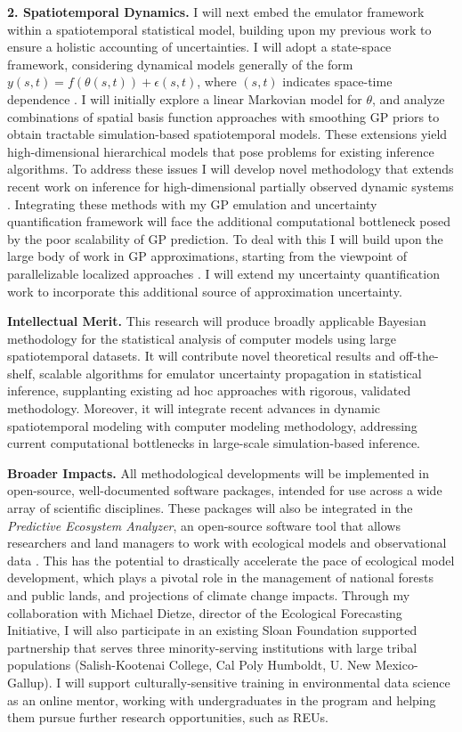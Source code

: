 \documentclass[11pt]{article}
\begin{document}
 \textbf{2. Spatiotemporal Dynamics.} I will next embed the emulator framework within a spatiotemporal statistical model, building upon my previous work to ensure a holistic accounting of uncertainties. I will adopt a state-space framework, considering dynamical models generally of the form $y(s, t) = f(\theta(s, t)) + \epsilon(s, t)$, where $(s, t)$ indicates space-time dependence \cite{Wikle, Hefley}. I will initially explore a linear Markovian model for $\theta$, and analyze combinations of spatial basis function approaches with smoothing GP priors to obtain tractable simulation-based spatiotemporal models. 
These extensions yield high-dimensional hierarchical models that pose problems for existing inference algorithms. To address these issues I will develop novel methodology that extends recent work on inference for high-dimensional partially observed dynamic systems \cite{Park}. Integrating these methods with my GP emulation and uncertainty quantification framework will face the additional computational bottleneck posed by the poor scalability of GP prediction. To deal with this I will build upon the large body of work in GP approximations, starting from the viewpoint of parallelizable localized approaches \cite{Gramacy}. I will extend my uncertainty quantification work to incorporate this additional source of approximation uncertainty. 

\noindent
\textbf{Intellectual Merit.} This research will produce broadly applicable Bayesian methodology for the statistical analysis of computer models using large spatiotemporal datasets. It will contribute novel theoretical results and off-the-shelf, scalable algorithms for emulator uncertainty propagation in statistical inference, supplanting existing ad hoc approaches with rigorous, validated methodology. Moreover, it will integrate recent advances in dynamic spatiotemporal modeling with computer modeling methodology, addressing current computational bottlenecks in large-scale simulation-based inference.

\noindent
\textbf{Broader Impacts.} All methodological developments will be implemented in open-source, well-documented software packages, intended for use across a wide array of scientific disciplines. These packages will also be integrated in the \textit{Predictive Ecosystem Analyzer}, an open-source software tool that allows researchers and land managers to work with ecological models and observational data \cite{Fer}. This has the potential to drastically accelerate the pace of ecological model development, which plays a pivotal role in the management of national forests and public lands, and projections of climate change impacts. Through my collaboration with Michael Dietze, director of the Ecological Forecasting Initiative, I will also participate in an existing Sloan Foundation supported partnership that serves three minority-serving institutions with large tribal populations (Salish-Kootenai College, Cal Poly Humboldt, U. New Mexico-Gallup). I will support culturally-sensitive training in environmental data science as an online mentor, working with undergraduates in the program and helping them pursue further research opportunities, such as REUs. 
\end{document}
